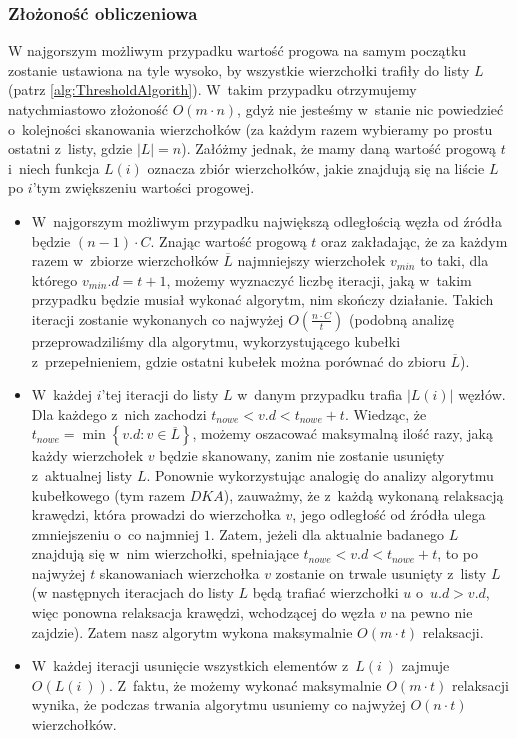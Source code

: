 \subsubsection{Złożoność obliczeniowa}

W najgorszym możliwym przypadku wartość progowa na samym początku zostanie ustawiona na tyle wysoko, by wszystkie wierzchołki trafiły do listy $L$ (patrz \ref{alg:ThresholdAlgorith}). W~takim przypadku otrzymujemy natychmiastowo złożoność $O \left( m \cdot n \right)$, gdyż nie jesteśmy w~stanie nic powiedzieć o~kolejności skanowania wierzchołków (za każdym razem wybieramy po prostu ostatni z~listy, gdzie $ \left| L \right| = n $). Załóżmy jednak, że mamy daną wartość progową $t$ i~niech funkcja $L \left( i \right)$ oznacza zbiór wierzchołków, jakie znajdują się na liście $L$ po $i$'tym zwiększeniu wartości progowej.

\begin{itemize}
\item W~najgorszym możliwym przypadku największą odległością węzła od źródła będzie $ \left( n - 1 \right) \cdot C $. Znając wartość progową $t$ oraz zakładając, że za każdym razem w~zbiorze wierzchołków $\overline{L}$ najmniejszy wierzchołek $v_{min}$ to taki, dla którego $v_{min}.d = t + 1$, możemy wyznaczyć liczbę iteracji, jaką w~takim przypadku będzie musiał wykonać algorytm, nim skończy działanie. Takich iteracji zostanie wykonanych co najwyżej $ O \left( \frac{n \cdot C}{t}\right)$ (podobną analizę przeprowadziliśmy dla algorytmu, wykorzystującego kubełki z~przepełnieniem, gdzie ostatni kubełek można porównać do zbioru $\overline{L}$).
\item W~każdej $i$'tej iteracji do listy $L$ w~danym przypadku trafia $\left| L \left( i \right) \right|$ węzłów. Dla każdego z~nich zachodzi $t_{nowe} < v.d < t_{nowe} + t$. Wiedząc, że $t_{nowe} = \min \left\{ v.d : v \in \overline{L} \right\}$, możemy oszacować maksymalną ilość razy, jaką każdy wierzchołek $v$ będzie skanowany, zanim nie zostanie usunięty z~aktualnej listy $L$. Ponownie wykorzystując analogię do analizy algorytmu kubełkowego (tym razem $DKA$), zauważmy, że z~każdą wykonaną relaksacją krawędzi, która prowadzi do wierzchołka $v$, jego odległość od źródła ulega zmniejszeniu o~co najmniej $1$. Zatem, jeżeli dla aktualnie badanego $L$ znajdują się w~nim wierzchołki, spełniające $t_{nowe} < v.d < t_{nowe} + t $, to po najwyżej $t$ skanowaniach wierzchołka $v$ zostanie on trwale usunięty z~listy $L$ (w następnych iteracjach do listy $L$ będą trafiać wierzchołki $u$ o~$u.d > v.d$, więc ponowna relaksacja krawędzi, wchodzącej do węzła $v$ na pewno nie zajdzie). Zatem nasz algorytm wykona maksymalnie $ O \left( m \cdot t \right)$ relaksacji.
\item W~każdej iteracji usunięcie wszystkich elementów z~$L \left( i~\right)$ zajmuje $ O \left( L \left( i~\right) \right)$. Z~faktu, że możemy wykonać maksymalnie $O \left( m \cdot t \right)$ relaksacji wynika, że podczas trwania algorytmu usuniemy co najwyżej $O \left( n \cdot t \right)$ wierzchołków.
\end{itemize}

